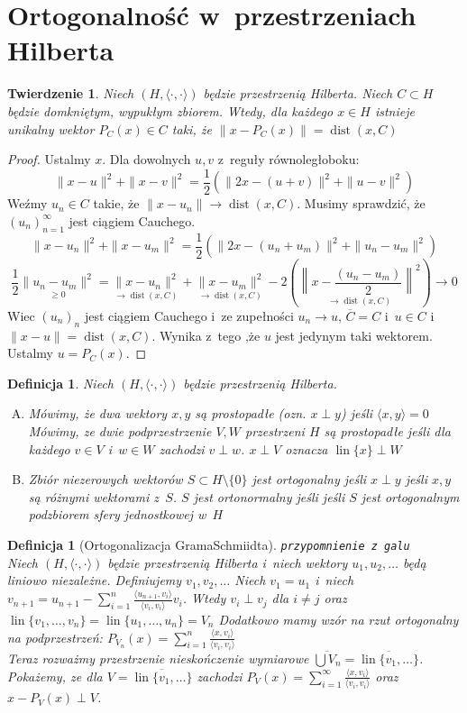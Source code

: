 \documentclass[11pt]{mwrep}
\renewcommand{\[}{\begin{equation}}
\renewcommand{\]}{\end{equation}}
\newcommand{\lin}{\operatorname{lin}}
\newcommand{\dist}{\operatorname{dist}}
\newcommand{\scal}{\langle \cdot,\cdot \rangle}
\newtheorem{twr}[subsection]{Twierdzenie}%
\newtheorem{de}[subsection]{Definicja}
\newcounter{numer}
\begin{document}
\section{Ortogonalność w~przestrzeniach Hilberta}
\begin{twr}
	Niech $(H,\scal)$ będzie przestrzenią Hilberta. Niech $C\subset H$ będzie domkniętym, wypukłym zbiorem.
	Wtedy, dla każdego $x\in H$ istnieje unikalny wektor $P_C(x) \in C$ taki, że $\|x-P_C(x) \| = \dist(x,C)$
\end{twr}
\begin{proof}
	Ustalmy $x$. Dla dowolnych $u,v$ z~reguły równoległoboku: 
	$$\|x - u\|^2 + \|x - v\|^2 = \frac{1}{2}\left( \|2x - (u+v)\|^2 + \|u-v\|^2 \right)$$
	Weźmy $u_n\in C$ takie, że $\|x-u_n\| \to \dist(x,C)$.
	Musimy sprawdzić, że $(u_n)_{n=1}^\infty$ jest ciągiem Cauchego.
	$$\|x-u_n\|^2 + \|x-u_m\|^2 = \frac{1}{2}\left( \|2x -(u_n+u_m)\|^2 + \|u_n - u_m\|^2 \right)$$
	$$\frac{1}{2} \underset{\ge 0}{\|u_n-u_m\|^2} = \underset{\to \dist(x,C)}{\|x-u_n\|^2} + \underset{\to \dist(x,C)}{\|x-u_m\|^2} - 
	2 \left( \underset{\to \dist(x,C)}{\left\|x-\frac{(u_n-u_m)}{2}\right\|^2} \right) \longrightarrow 0$$
	Wiec $(u_n)_n$ jest ciągiem Cauchego i~ze zupełności $u_n \to u$, $\overline{C} = C$ i~$u\in C$ 
	i~$\|x -u\|= \dist(x,C)$. Wynika z~tego ,że $u$ jest jedynym taki wektorem. Ustalmy $u = P_C(x)$.
\end{proof}
\begin{de}
	Niech $(H,\scal)$ będzie przestrzenią Hilberta.
	\begin{enumerate}[(A)]
		\item	Mówimy, że dwa wektory $x,y$ są prostopadłe (ozn. $x\perp y$)  jeśli $\langle x,y \rangle=0$
			Mówimy, ze dwie podprzestrzenie $V,W$ przestrzeni $H$  są prostopadłe jeśli dla każdego $v \in V$ i~$w \in W$ zachodzi $v\perp w$.
			$x\perp V$ oznacza $\lin\{x\} \perp W$
		\item Zbiór niezerowych wektorów $S \subset H\setminus\{0\}$ jest ortogonalny jeśli $x\perp y$ jeśli $x,y$ są różnymi wektorami z~$S$.
			$S$ jest ortonormalny jeśli jeśli $S$ jest ortogonalnym podzbiorem sfery jednostkowej w~$H$ 
	\end{enumerate}
\end{de}
\begin{de}[Ortogonalizacja Grama\dywiz Schmiidta]
	\texttt{przypomnienie z~galu}\\
	Niech $(H,\scal)$ będzie przestrzenią Hilberta i~niech wektory $u_1,u_2,\ldots$ będą liniowo niezależne.
	Definiujemy $v_1,v_2,\ldots$ 
	Niech $v_1 = u_1$ i~niech $v_{n+1}= u_{n+1} - \sum_{i=1}^n\frac{\langle u_{n+1},v_i \rangle}{\langle v_i,v_i \rangle}v_i$. 
	Wtedy $v_i \perp v_j$ dla $i\not = j$ oraz $\lin\{v_1,\ldots,v_n\} = \lin\{u_1,\ldots,u_n\} = V_n$ 
	Dodatkowo mamy wzór na rzut ortogonalny na podprzestrzeń: $P_{V_n}(x) = \sum_{i=1}^n \frac{\langle x,v_i \rangle}{\langle v_i,v_i \rangle}$\\
	Teraz rozważmy przestrzenie nieskończenie wymiarowe $\overline{\bigcup V_n} = \overline{\lin\{v_1,\ldots\}}$.
	Pokażemy, ze dla $V= \overline{\lin\{v_1,\ldots\}}$ zachodzi $P_V(x) = \sum_{i=1}^\infty \frac{\langle x,v_i \rangle}{\langle v_i,v_i \rangle}$
	oraz $x- P_V(x) \perp V$.
\end{de}
\end{document}
